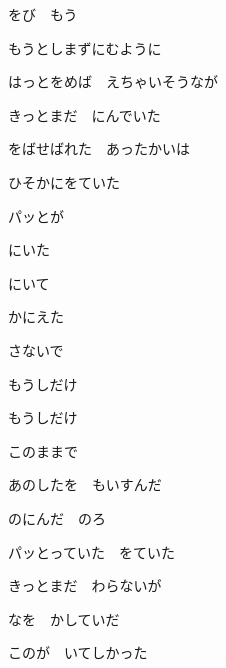 をび　もう

もうとしまずにむように

\bigskip

はっとをめば　えちゃいそうなが

きっとまだ　にんでいた

をばせばれた　あったかいは

ひそかにをていた

\bigskip

パッとが

にいた

にいて

かにえた

さないで

もうしだけ

もうしだけ

このままで

\bigskip

あのしたを　もいすんだ

のにんだ　のろ

\bigskip

パッとっていた　をていた

きっとまだ　わらないが

なを　かしていだ

このが　いてしかった

